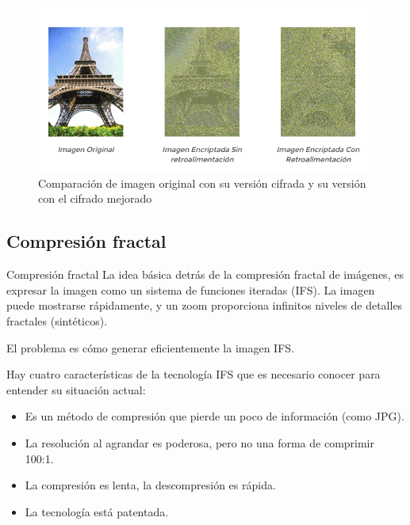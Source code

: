 \documentclass[8pt]{beamer}
\begin{document}
\begin{frame}
\begin{figure}[hbpt]
\centering
\includegraphics[width = \textwidth]{img/imagenCifradaRetro.png}
\caption{Comparación de imagen original con su versión cifrada y su versión con el cifrado mejorado}
\label{fig:ImagenCifradaRetro}
\end{figure}
\end{frame}

\subsection{Compresión fractal}
\begin{frame}
\begin{block}{Compresión fractal}
La idea básica detrás de la compresión fractal de imágenes, es expresar la imagen como un sistema de funciones iteradas (IFS). La imagen puede mostrarse rápidamente, y un zoom proporciona infinitos niveles de detalles fractales (sintéticos).

El problema es cómo generar eficientemente la imagen IFS.
\end{block}

Hay cuatro características de la tecnología IFS que es necesario conocer para entender su situación actual:
\begin{itemize}
\item Es un método de compresión que pierde un poco de información (como JPG).
\item La resolución al agrandar es poderosa, pero no una forma de comprimir 100:1.
\item La compresión es lenta, la descompresión es rápida.
\item La tecnología está patentada.
\end{itemize}

\end{frame}
\end{document}
